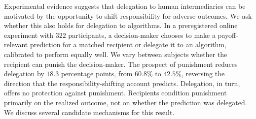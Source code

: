 \noindent Experimental evidence suggests that delegation to human intermediaries can be motivated by the opportunity to shift responsibility for adverse outcomes. We ask whether this also holds for delegation to algorithms. %
In a preregistered online experiment with $322$ participants, a decision-maker chooses to make a payoff-relevant prediction for a matched recipient or delegate it to an algorithm, calibrated to perform equally well. We vary between subjects whether the recipient can punish the decision-maker. The prospect of punishment reduces delegation by $18.3$ percentage points, from $60.8\%$ to $42.5\%$, reversing the direction that the responsibility-shifting account predicts. Delegation, in turn, offers no protection against punishment. Recipients condition punishment primarily on the realized outcome, not on whether the prediction was delegated. %
We discuss several candidate mechanisms for this result.